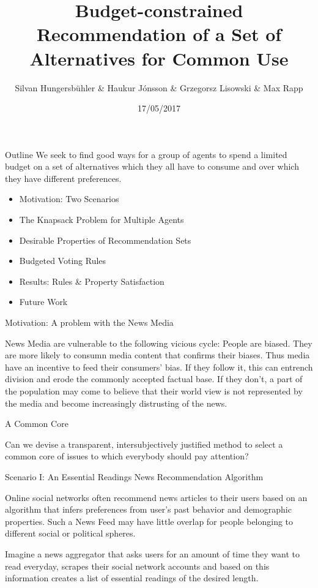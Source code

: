 \documentclass{beamer}
\title{Budget-constrained Recommendation of a Set of Alternatives for Common Use}
\author{Silvan Hungersb\"{u}hler \& Haukur J\'{o}nsson \& Grzegorsz Lisowski \& Max Rapp}
\date{17/05/2017}
\begin{document}
\begin{frame}
	\titlepage
\end{frame}

\begin{frame}{Outline}
We seek to find good ways for a group of agents to spend a limited budget on a set of alternatives which they all have to consume and over which they have different preferences. 
	\begin{itemize}
		\item Motivation: Two Scenarios
		\item The Knapsack Problem for Multiple Agents
		\item Desirable Properties of Recommendation Sets
		\item Budgeted Voting Rules
		\item Results: Rules \& Property Satisfaction
		\item Future Work
	\end{itemize}


\end{frame}

\begin{frame}{Motivation: A problem with the News Media}

News Media are vulnerable to the following vicious cycle: People are biased. They are more likely to consumn media content that confirms their biases. Thus media have an incentive to feed their consumers' bias. If they follow it, this can entrench division and erode the commonly accepted factual base. If they don't, a part of the population may come to believe that their world view is not represented by the media and become increasingly distrusting of the news.



\end{frame}

\begin{frame}{A Common Core}

Can we devise a transparent,  intersubjectively justified method to select a common core of issues to which everybody should pay attention?
  
	
\end{frame}
\begin{frame}{Scenario I: An Essential Readings News Recommendation Algorithm}

Online social networks often recommend news articles to their users based on an algorithm that infers preferences from user's past behavior and demographic properties. Such a News Feed may have little overlap for people belonging to different social or political spheres.


Imagine a news aggregator that asks users for an amount of time they want to read everyday, scrapes their social network accounts and based on this information creates a list of essential readings of the desired length.




  

\end{frame}
\end{document}
